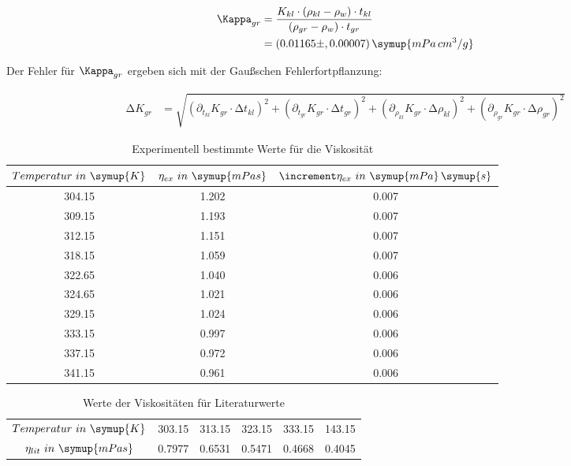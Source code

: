 \begin{align}
  \Kappa_{gr} &= \frac{K_{kl} \cdot \left( \rho_{kl} - \rho_{w} \right) \cdot t_{kl}}{\left( \rho_{gr} - \rho_{w} \right) \cdot t_{gr}} \\
              &= (0.01165 \pm, 0.00007) \, \symup{mPa\, cm^3 / g}
\end{align}

Der Fehler für $\Kappa_{gr}$ ergeben sich mit der Gaußschen Fehlerfortpflanzung:

\begin{align}
\increment K_{gr} &= \sqrt{ \left( \partial_{t_{kl}} K_{gr} \cdot \increment t_{kl} \right)^2 +
                            \left( \partial_{t_{gr}} K_{gr} \cdot \increment t_{gr} \right)^2 +
                            \left( \partial_{\rho_{kl}} K_{gr} \cdot \increment \rho_{kl} \right)^2 +
                            \left( \partial_{\rho_{gr}} K_{gr} \cdot \increment \rho_{gr} \right)^2 }
\end{align}

\begin{table}
  \centering
  \caption{Experimentell bestimmte Werte für die Viskosität}
  \label{tab:nuExp}
  \begin{tabular}{c c c}
    \toprule $Temperatur \,\, in \,\, \symup{K}$ & $\eta_{ex} \,\, in \,\, \symup{ mPa s}$ &
            $\increment \eta_{ex} \,\, in \,\, \symup{mPa} \, \symup{s}$   \\
    \midrule
    304.15 & 1.202 & 0.007 \\
    309.15 & 1.193 & 0.007 \\
    312.15 & 1.151 & 0.007 \\
    318.15 & 1.059 & 0.007 \\
    322.65 & 1.040 & 0.006 \\
    324.65 & 1.021 & 0.006 \\
    329.15 & 1.024 & 0.006 \\
    333.15 & 0.997 & 0.006 \\
    337.15 & 0.972 & 0.006 \\
    341.15 & 0.961 & 0.006 \\
    \bottomrule
  \end{tabular}
\end{table}

\begin{table}
  \centering
  \caption{Werte der Viskositäten für Literaturwerte}
  \label{tab:nuLit}
  \begin{tabular}{c c c c c c}
    \toprule
    $Temperatur \,\, in \,\, \symup{K}$       & 303.15 & 313.15 & 323.15 & 333.15 & 143.15 \\
    $\eta_{lit} \,\, in \,\, \symup{ mPa s}$  & 0.7977 & 0.6531 & 0.5471 & 0.4668 & 0.4045 \\
    \bottomrule
  \end{tabular}
\end{table}

